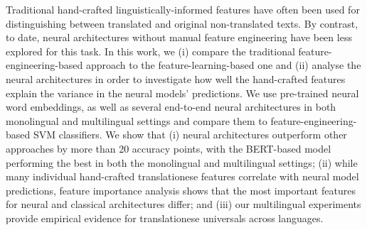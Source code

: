 Traditional hand-crafted linguistically-informed features have often been used for distinguishing between translated and original non-translated texts. By contrast, to date, neural architectures without manual feature engineering have been less explored for this task. In this work, we (i) compare the traditional feature-engineering-based approach to the feature-learning-based one and (ii) analyse the neural architectures in order to investigate how well the hand-crafted features explain the variance in the neural models' predictions. We use pre-trained neural word embeddings, as well as several end-to-end neural architectures in both monolingual and multilingual settings and compare them to feature-engineering-based SVM classifiers. We show that (i) neural architectures outperform other approaches by more than 20 accuracy points, with the BERT-based model performing the best in both the monolingual and multilingual settings; (ii) while many individual hand-crafted translationese features correlate with neural model predictions, feature importance analysis shows that the most important features for neural and classical architectures differ; and (iii) our multilingual experiments provide empirical evidence for translationese universals across languages.
